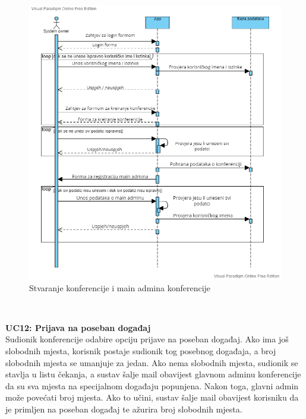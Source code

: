 		        \begin{figure}[H]
			            \includegraphics[scale=0.55]{slike/Stvaranje_konf_seq.png} %
			            \centering
			            \caption{Stvaranje konferencije i main admina konferencije}
			            \label{fig:seq-dijagram2}
		        \end{figure}\\
				
				\eject

             \textbf{UC12: Prijava na poseban događaj}\\
				
				{Sudionik konferencije odabire opciju prijave na poseban događaj. Ako ima još slobodnih mjesta, korisnik postaje sudionik tog posebnog događaja, a broj slobodnih mjesta se umanjuje za jedan. Ako nema slobodnih mjesta, sudionik se stavlja u listu čekanja, a sustav šalje mail obavijest glavnom adminu konferencije da su sva mjesta na specijalnom događaju popunjena. Nakon toga, glavni admin može povećati broj mjesta. Ako to učini, sustav šalje mail obavijest korisniku da je primljen na poseban događaj te ažurira broj slobodnih mjesta.}
				
